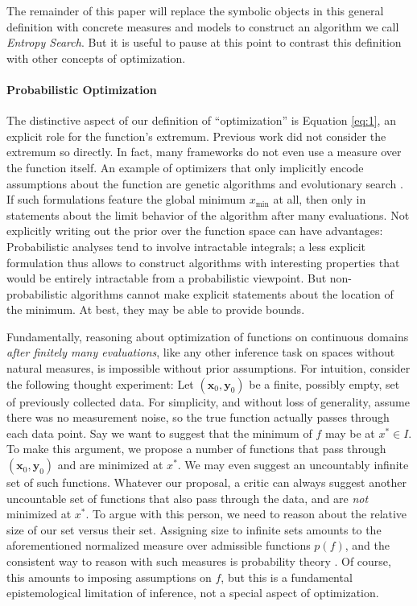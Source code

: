 \documentclass[twoside,11pt]{article}
\newcommand{\vx}{\vec{x}}
\newcommand{\vy}{\vec{y}}
\newcommand{\xmin}{x_{\min}}
\renewcommand{\vec}{\boldsymbol}
\begin{document}
The remainder of this paper will replace the symbolic objects in this
general definition with concrete measures and models to construct an
algorithm we call \emph{Entropy Search}. But it is useful to pause at
this point to contrast this definition with other concepts of
optimization.

\paragraph{Probabilistic Optimization}
\label{sec:prob-optim}
The distinctive aspect of our definition of ``optimization'' is
Equation \eqref{eq:1}, an explicit role for the function's
extremum. Previous work did not consider the extremum so directly. In
fact, many frameworks do not even use a measure over the function
itself. An example of optimizers that only implicitly encode
assumptions about the function are genetic algorithms
\citep{schmitt2004theory} and evolutionary search
\citep{hansen2001completely}. If such formulations feature the global
minimum $\xmin$ at all, then only in statements about the limit
behavior of the algorithm after many evaluations. Not explicitly
writing out the prior over the function space can have advantages:
Probabilistic analyses tend to involve intractable integrals; a less
explicit formulation thus allows to construct algorithms with
interesting properties that would be entirely intractable from a
probabilistic viewpoint. But non-probabilistic algorithms cannot make
explicit statements about the location of the minimum. At best, they
may be able to provide bounds.

Fundamentally, reasoning about optimization of functions on continuous
domains \emph{after finitely many evaluations}, like any other
inference task on spaces without natural measures, is impossible
without prior assumptions. For intuition, consider the following
thought experiment: Let $(\vx_0,\vy_0)$ be a finite, possibly empty, set
of previously collected data. For simplicity, and without loss of
generality, assume there was no measurement noise, so the true
function actually passes through each data point. Say we want to
suggest that the minimum of $f$ may be at $x^* \in I$. To make this
argument, we propose a number of functions that pass through
$(\vx_0,\vy_0)$ and are minimized at $x^*$. We may even suggest an
uncountably infinite set of such functions. Whatever our proposal, a
critic can always suggest another uncountable set of functions that
also pass through the data, and are \emph{not} minimized at $x^*$. To
argue with this person, we need to reason about the relative size of
our set versus their set. Assigning size to infinite sets amounts to
the aforementioned normalized measure over admissible functions
$p(f)$, and the consistent way to reason with such measures is
probability theory \citep{kolmogorov_axioms,cox1946probability}. Of
course, this amounts to imposing assumptions on $f$, but this is a
fundamental epistemological limitation of inference, not a special
aspect of optimization.
\end{document}

